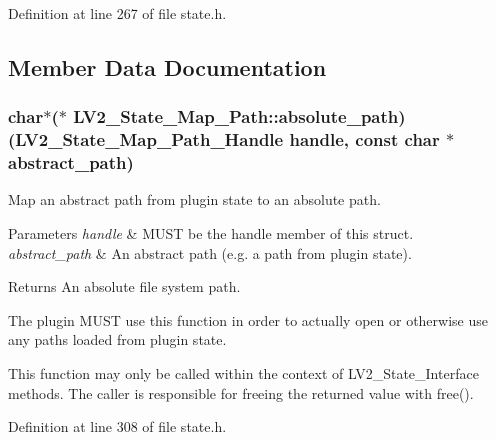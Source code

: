 Definition at line 267 of file state.\+h.



\subsection{Member Data Documentation}
\subsubsection[{\texorpdfstring{absolute\+\_\+path}{absolute_path}}]{\setlength{\rightskip}{0pt plus 5cm}char$\ast$($\ast$ L\+V2\+\_\+\+State\+\_\+\+Map\+\_\+\+Path\+::absolute\+\_\+path) ({\bf L\+V2\+\_\+\+State\+\_\+\+Map\+\_\+\+Path\+\_\+\+Handle} {\bf handle}, {\bf const} char $\ast${\bf abstract\+\_\+path})}\hypertarget{struct_l_v2___state___map___path_a1b84232ea39fbaf8444ca437a0480b8f}{}\label{struct_l_v2___state___map___path_a1b84232ea39fbaf8444ca437a0480b8f}
Map an abstract path from plugin state to an absolute path. 
\begin{DoxyParams}{Parameters}
{\em handle} & M\+U\+ST be the {\ttfamily handle} member of this struct. \\
\hline
{\em abstract\+\_\+path} & An abstract path (e.\+g. a path from plugin state). \\
\hline
\end{DoxyParams}
\begin{DoxyReturn}{Returns}
An absolute file system path.
\end{DoxyReturn}
The plugin M\+U\+ST use this function in order to actually open or otherwise use any paths loaded from plugin state.

This function may only be called within the context of L\+V2\+\_\+\+State\+\_\+\+Interface methods. The caller is responsible for freeing the returned value with free(). 

Definition at line 308 of file state.\+h.

